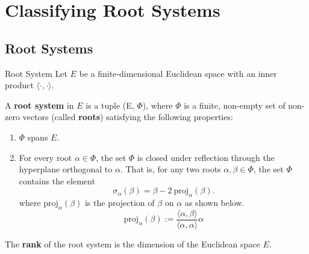 %


\chapter{Classifying Root Systems}
\section{Root Systems}

\begin{nameddefinition}{Root System}
    Let $E$ be a finite-dimensional Euclidean space with an inner product $\langle \cdot, \cdot \rangle$. \newline
    
    A \textbf{root system} in $E$ is a tuple (E, $\Phi$), where $\Phi$ is a finite, non-empty set of non-zero vectors (called \textbf{roots}) satisfying the following properties:
    \begin{enumerate}[label=(R{\arabic*})]
        \item $\Phi$ spans $E$.
        \item For every root $\alpha \in \Phi$, the set $\Phi$ is closed under reflection through the hyperplane orthogonal to $\alpha$.
        That is, for any two roots $\alpha, \beta \in \Phi$, the set $\Phi$ contains the element
        \begin{equation*}
            \sigma_\alpha(\beta) = \beta - 2 \ \text{proj}_{\alpha}(\beta).
        \end{equation*}
        where $\text{proj}_{\alpha}(\beta)$ is the projection of $\beta$ on $\alpha$ as shown below.
        \begin{equation*}
            \text{proj}_{\alpha}(\beta) := \frac{ \langle \alpha, \beta \rangle}{\langle \alpha, \alpha \rangle} \alpha
        \end{equation*}
    \end{enumerate}

    The \textbf{rank} of the root system is the dimension of the Euclidean space $E$.
\end{nameddefinition}

